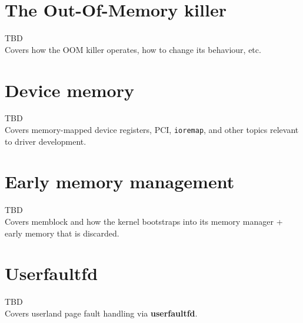 \documentclass[a4paper,oneside]{scrbook}
\begin{document}
\chapter{The Out-Of-Memory killer}

TBD\\

Covers how the OOM killer operates, how to change its behaviour, etc.\\

\chapter{Device memory}

TBD\\

Covers memory-mapped device registers, PCI, \texttt{ioremap}, and other
topics relevant to driver development.\\

\chapter{Early memory management}

TBD\\

Covers memblock and how the kernel bootstraps into its memory manager + early
memory that is discarded.\\

\chapter{Userfaultfd}

TBD\\

Covers userland page fault handling via \textbf{userfaultfd}.\\

\backmatter
\printindex
\end{document}
